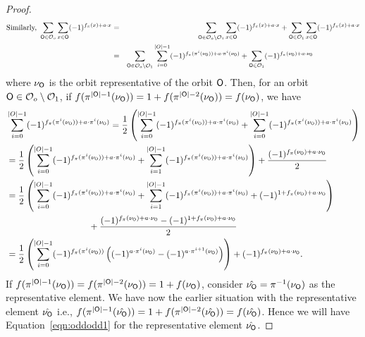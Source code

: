 \documentclass{llncs}
\begin{document}
\begin{proof}
\begin{eqnarray}\label{eqn:odd0}
\text{Similarly, } \sum_{\mathsf{O} \in \mathcal{O}_o} \sum_{x \in \mathsf{O}} (-1)^{ f_\pi(x) + a \cdot x}
& = & \sum_{\mathsf{O} \in \mathcal{O}_o\setminus\mathcal{O}_1} \sum_{x \in \mathsf{O}} (-1)^{ f_\pi(x) + a \cdot x} + \sum_{\mathsf{O} \in \mathcal{O}_1} \sum_{x \in \mathsf{O}} (-1)^{ f_\pi(x) + a \cdot x} \nonumber\\
& = & \sum_{\mathsf{O} \in \mathcal{O}_o\setminus\mathcal{O}_1} \sum_{i=0}^{|O|-1} (-1)^{ f_\pi(\pi^i(\nu_{\mathsf{O}})) + a \cdot \pi^i(\nu_{\mathsf{O}})} + \sum_{\mathsf{O} \in \mathcal{O}_1} (-1)^{ f_\pi(\nu_{\mathsf{O}}) + a \cdot \nu_{\mathsf{O}}}~~~~~~~~~~~~~~~~~~~
\end{eqnarray}
where $\nu_{\mathsf{O}}$ is the orbit representative of the orbit $\mathsf{O}$. Then, for an orbit $\mathsf{O} \in \mathcal{O}_o\setminus\mathcal{O}_1$,
if $f(\pi^{|\mathsf{O}|-1}(\nu_{\mathsf{O}})) = 1+f(\pi^{|\mathsf{O}|-2}(\nu_{\mathsf{O}})) = f(\nu_{\mathsf{O}})$, we have
\begin{align}\label{eqn:oddodd1}
& \sum_{i=0}^{|O|-1} (-1)^{ f_\pi(\pi^i(\nu_{\mathsf{O}}))+ a \cdot \pi^i(\nu_{\mathsf{O}})}  
= \frac{1}{2}\left(\sum_{i=0}^{|O|-1} (-1)^{ f_\pi(\pi^i(\nu_{\mathsf{O}})) + a \cdot \pi^i(\nu_{\mathsf{O}})}+\sum_{i=0}^{|O|-1} (-1)^{ f_\pi(\pi^i(\nu_{\mathsf{O}})) + a \cdot \pi^i(\nu_{\mathsf{O}})}\right) \nonumber\\
& = \frac{1}{2}\left(\sum_{i=0}^{|O|-1} (-1)^{ f_\pi(\pi^i(\nu_{\mathsf{O}})) + a \cdot \pi^i(\nu_{\mathsf{O}})}+\sum_{i=1}^{|O|-1} (-1)^{ f_\pi(\pi^i(\nu_{\mathsf{O}})) + a \cdot \pi^i(\nu_{\mathsf{O}})}\right) + \frac{(-1)^{f_\pi(\nu_{\mathsf{O}}) + a \cdot \nu_{\mathsf{O}}}}{2}\nonumber\\
& = \frac{1}{2}\left(\sum_{i=0}^{|O|-1} (-1)^{ f_\pi(\pi^i(\nu_{\mathsf{O}})) + a \cdot \pi^i(\nu_{\mathsf{O}})}+\sum_{i=1}^{|O|-1} (-1)^{ f_\pi(\pi^i(\nu_{\mathsf{O}})) + a \cdot \pi^i(\nu_{\mathsf{O}})}+(-1)^{1+f_\pi(\nu_{\mathsf{O}}) + a \cdot \nu_{\mathsf{O}}}\right) \nonumber\\
& ~~~~~~~~~~~~~~~~~~~~~~~~~~~~+ \frac{(-1)^{f_\pi(\nu_{\mathsf{O}}) + a \cdot \nu_{\mathsf{O}}}-(-1)^{1+f_\pi(\nu_{\mathsf{O}}) + a \cdot \nu_{\mathsf{O}}}}{2} \nonumber\\
& = \frac{1}{2}\left(\sum_{i=0}^{|O|-1} (-1)^{f_\pi(\pi^i(\nu_{\mathsf{O}}))}
\left((-1)^{a \cdot \pi^i(\nu_{\mathsf{O}})} - (-1)^{a \cdot \pi^{i+1}(\nu_{\mathsf{O}})}\right)\right) + (-1)^{f_\pi(\nu_{\mathsf{O}}) + a \cdot \nu_{\mathsf{O}}}.
\end{align}
If $f(\pi^{|\mathsf{O}|-1}(\nu_{\mathsf{O}})) = f(\pi^{|\mathsf{O}|-2}(\nu_{\mathsf{O}})) = 1+f(\nu_{\mathsf{O}})$, consider $\hat{\nu_{\mathsf{O}}} = \pi^{-1} (\nu_{\mathsf{O}})$ as the representative element. We have now the earlier situation with the representative element $\hat{\nu_{\mathsf{O}}}$ i.e., $f(\pi^{|\mathsf{O}|-1}(\hat{\nu_{\mathsf{O}}})) = 1+f(\pi^{|\mathsf{O}|-2}(\hat{\nu_{\mathsf{O}}})) = f(\hat{\nu_{\mathsf{O}}})$. Hence we will have Equation~\ref{eqn:oddodd1} for the representative element $\hat{\nu_{\mathsf{O}}}$.

\end{proof}
\end{document}
